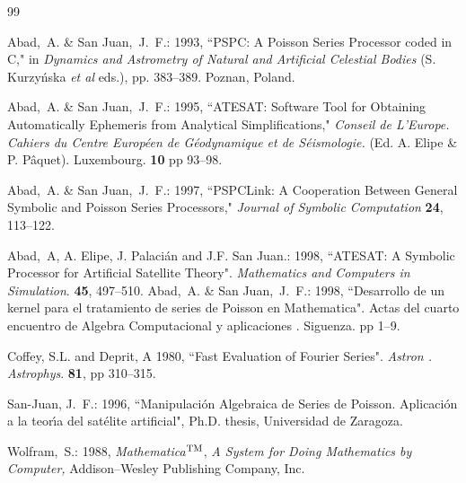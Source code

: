 \begin{thebibliography}{99}

 Abad,~A. \& San Juan,~J.~F.: 1993, ``{PSPC}: {A} {P}oisson
{S}eries {P}rocessor coded in {C}," in {\it Dynamics and Astrometry of Natural
and Artificial Celestial Bodies} (S. Kurzy\'nska {\it et al} eds.), pp.
383--389. Poznan, Poland.

 Abad,~A. \& San Juan,~J.~F.: 1995, ``{ATESAT}: Software Tool
for Obtaining Automatically Ephemeris from Analytical Simplifications," {\it
Conseil de L'Europe. Cahiers du Centre Europ\'een de G\'eodynamique et de
S\'eismologie.} (Ed. A. Elipe \& P. P\^aquet). Luxembourg. {\bf 10} pp 93--98.

 Abad,~A. \& San Juan,~J.~F.: 1997, ``PSPCLink: A Cooperation
Between General Symbolic and Poisson Series Processors,"  {\sl
Journal of Symbolic Computation} {\bf 24}, 113--122.

 Abad,~A, A. Elipe, J. Palaci\'an and J.F. San Juan.: 1998,
``ATESAT: A Symbolic Processor for Artificial Satellite Theory". {\it Mathematics
and Computers in Simulation}. {\bf 45}, 497--510.
 Abad,~A. \& San Juan,~J.~F.: 1998, ``Desarrollo de un kernel para
el tratamiento de series de Poisson en  Mathematica". Actas del cuarto
encuentro de Algebra Computacional y aplicaciones . Siguenza. pp 1--9.

 Coffey, S.L. and Deprit, A 1980, ``Fast Evaluation of Fourier
Series". {\it Astron . Astrophys}. {\bf 81}, pp 310--315.

San-Juan, J.~F.: 1996, ``Manipulaci\'on Algebraica de Series
de Poisson. Aplicaci\'on a la  teor\'{\i}a del sat\'elite artificial",
Ph.D. thesis, Universidad de Zaragoza.

Wolfram,~S.: 1988, {\sl Mathematica}$^{\rm TM}$, {\it A System
for Doing Mathematics by Computer,\/} Addison--Wesley Publishing Company,
Inc.

\end{thebibliography}

